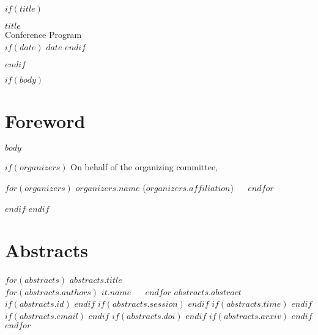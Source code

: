 \documentclass[$fontsize$]{absbook}
\begin{document}

$if(title)$
\begin{center}
    {\large $title$} \vspace{2cm} \\

    {\Huge \sc Conference Program} \\

    $if(date)$
    \vspace{5cm}
    $date$
    $endif$
\end{center}
\newpage
$endif$

$if(body)$
\section*{Foreword}

$body$

$if(organizers)$
\vspace*{\fill}
\hfill On behalf of the organizing committee,\\
\begin{flushright}
    $for(organizers)$
    $organizers.name$ (\textit{$organizers.affiliation$}) ~\bullet~
    $endfor$
\end{flushright}
\newpage
$endif$
$endif$

\section*{Abstracts}

$for(abstracts)$
    \setcounter{sidenote}{1}
    {\Large $abstracts.title$} \\
    $for(abstracts.authors)$
    $it.name$ ~\bullet~
    $endfor$
    {\justify
        $abstracts.abstract$
    } \\
    $if(abstracts.id)$
    $endif$
    $if(abstracts.session)$
    $endif$
    $if(abstracts.time)$
    $endif$
    $if(abstracts.email)$
    $endif$
    $if(abstracts.doi)$
    $endif$
    $if(abstracts.arxiv)$
    $endif$
    \vspace{2cm}
$endfor$
\end{document}
